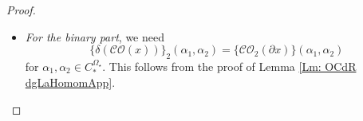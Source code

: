 \documentclass[10pt,a4paper]{amsart}
\newcommand{\CBa}{C_*^{\Omega_\star}}
\newcommand{\CO}{\mathcal{CO}}
\newcommand{\wt}[1]{\widetilde{#1}}
\begin{document}
\begin{proof}
\begin{itemize}
\begin{align*}
	&(-1)^{|\alpha||x|}\big( \wt{\star^1} \bullet (\alpha\circ x)-(\wt{\star^1}\bullet \alpha)\circ x \big)(a,k)\\
	=& (-1)^{|\alpha||x|} \left(-\sum(-1)^{(k'+1)(|x|+1+k'')+|\alpha|} (\wt{\star^1}(0,1)\bullet \alpha(a',k')) \circ_1 x(a'',k'')\right)
\end{align*}
and 
\begin{align*}
	&(-1)^{|\alpha||x|}\big( -  (-1)^{|\alpha|+|x|}(\alpha\circ x) \bullet \wt{\star^1} +(-1)^{|\alpha|} (\alpha\bullet \wt{\star^1})\circ x \big)(a,k)\\
	=& (-1)^{|\alpha|(|x|+1)} \sum (-1)^{k'k'' + (k'+1)(|x|+1+k'')} \big(\alpha(a',k')\bullet \wt{\star^1}(0,1)\big)\circ_{k'+1}x(a'',k'').
\end{align*}
The desired equality then follows from  parts (2) and (4) of Lemma \ref{Lm: dRchainStarAnon}.


	\bigskip
	




 \item \emph{For the binary part}, we need 
	\[\big\{\delta(\CO(x))\big\}_2(\alpha_1,\alpha_2)=\big\{\CO_2(\partial x)\big\}(\alpha_1,\alpha_2) \] for $\alpha_1,\alpha_2\in \CBa$. This follows from the proof of Lemma \ref{Lm: OCdR dgLaHomomApp}.
\end{itemize}
\end{proof}
\end{document}
